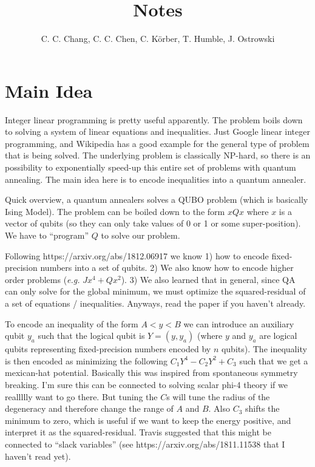 \documentclass[]{article}
\author{C. C. Chang, C. C. Chen, C. K\"orber, T. Humble, J. Ostrowski}
\title{Notes}
\begin{document}
\maketitle

\section{Main Idea}

Integer linear programming is pretty useful apparently. The problem boils down to solving a system of linear equations and inequalities. Just Google linear integer programming, and Wikipedia has a good example for the general type of problem that is being solved. The underlying problem is classically NP-hard, so there is an possibility to exponentially speed-up this entire set of problems with quantum annealing. The main idea here is to encode inequalities into a quantum annealer.

Quick overview, a quantum annealers solves a QUBO problem (which is basically Ising Model). The problem can be boiled down to the form $x Q x$ where $x$ is a vector of qubits (so they can only take values of 0 or 1 or some super-position). We have to ``program'' $Q$ to solve our problem.

Following https://arxiv.org/abs/1812.06917 we know 1) how to encode fixed-precision numbers into a set of qubits. 2) We also know how to encode higher order problems (\textit{e.g.} $J x^4 + Q x^2$). 3)  We also learned that in general, since QA can only solve for the global minimum, we must optimize the squared-residual of a set of equations / inequalities. Anyways, read the paper if you haven't already.

To encode an inequality of the form $A < y < B$ we can introduce an auxiliary qubit $y_a$ such that the logical qubit is $Y = (y, y_a)$ (where $y$ and $y_a$ are logical qubits representing fixed-precision numbers encoded by $n$ qubits). The inequality is then encoded as minimizing the following $C_1 Y^4 - C_2 Y^2 + C_3$ such that we get a mexican-hat potential. Basically this was inspired from spontaneous symmetry breaking. I'm sure this can be connected to solving scalar phi-4 theory if we reallllly want to go there. But tuning the $C$s will tune the radius of the degeneracy and therefore change the range of $A$ and $B$.  Also $C_3$ shifts the minimum to zero, which is useful if we want to keep the energy positive, and interpret it as the squared-residual. Travis suggested that this might be connected to ``slack variables'' (see https://arxiv.org/abs/1811.11538 that I haven't read yet).
\end{document}

